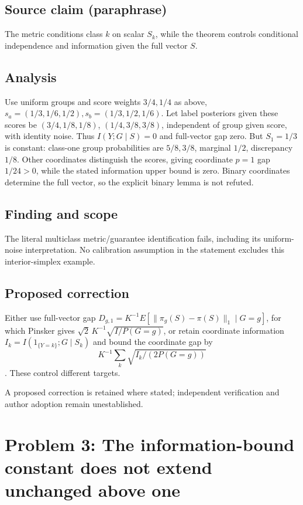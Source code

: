 \documentclass[11pt]{article}
\begin{document}
\subsection*{Source claim (paraphrase)}

The metric conditions class \(k\) on scalar \(S_k\), while the theorem controls conditional independence and information given the full vector \(S\).

\subsection*{Analysis}

Use uniform groups and score weights \(3/4,1/4\) as above, \(s_a=(1/3,1/6,1/2),s_b=(1/3,1/2,1/6)\). Let label posteriors given these scores be \((3/4,1/8,1/8)\), \((1/4,3/8,3/8)\), independent of group given score, with identity noise. Thus \(I(Y;G\mid S)=0\) and full-vector gap zero. But \(S_1=1/3\) is constant: class-one group probabilities are \(5/8,3/8\), marginal \(1/2\), discrepancy \(1/8\). Other coordinates distinguish the scores, giving coordinate \(p=1\) gap \(1/24>0\), while the stated information upper bound is zero. Binary coordinates determine the full vector, so the explicit binary lemma is not refuted.

\subsection*{Finding and scope}

The literal multiclass metric/guarantee identification fails, including its uniform-noise interpretation. No calibration assumption in the statement excludes this interior-simplex example.

\subsection*{Proposed correction}

Either use full-vector gap \(D_{g,1}=K^{-1}E[\|\pi_g(S)-\pi(S)\|_1\mid G=g]\), for which Pinsker gives \(\sqrt2\,K^{-1}\sqrt{I/P(G=g)}\), or retain coordinate information \(I_k=I(1_{\{Y=k\}};G\mid S_k)\) and bound the coordinate gap by \[K^{-1}\sum_k\sqrt{I_k/(2P(G=g))}\]. These control different targets.

A proposed correction is retained where stated; independent verification and author adoption remain unestablished.

\section*{Problem 3: The information-bound constant does not extend unchanged above one}
\end{document}
